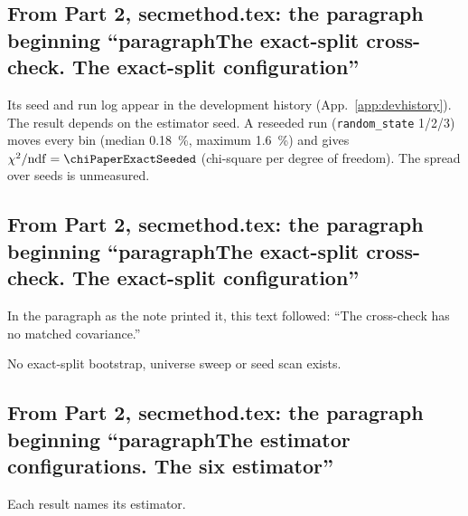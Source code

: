 \subsection{From Part 2, secmethod.tex: the paragraph beginning ``paragraphThe exact-split cross-check. The exact-split configuration''}
Its seed and run log appear in the development history (App.~\ref{app:devhistory}). The result depends on the estimator seed. A reseeded run (\texttt{random\_state} 1/2/3) moves every bin (median \SI{0.18}{\percent}, maximum \SI{1.6}{\percent}) and gives $\chi^{2}/\mathrm{ndf}=\chiPaperExactSeeded$ (chi-square per degree of freedom). The spread over seeds is unmeasured.

\subsection{From Part 2, secmethod.tex: the paragraph beginning ``paragraphThe exact-split cross-check. The exact-split configuration''}
In the paragraph as the note printed it, this text followed: ``The cross-check has no matched covariance.''\par
No exact-split bootstrap, universe sweep or seed scan exists.



\subsection{From Part 2, secmethod.tex: the paragraph beginning ``paragraphThe estimator configurations. The six estimator''}
Each result names its estimator.

